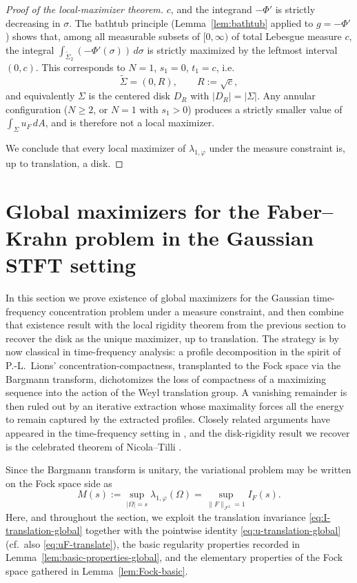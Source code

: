 \documentclass[a4paper,11pt,reqno]{amsart}
\numberwithin{equation}{section}
\theoremstyle{plain} %
\theoremstyle{definition} %
\theoremstyle{remark}
\begin{document}
\begin{proof}[Proof of the local-maximizer theorem]
\(c\), and the integrand \(-\Phi'\) is strictly decreasing in \(\sigma\). The
bathtub principle (Lemma~\ref{lem:bathtub} applied to \(g=-\Phi'\)) shows
that, among all measurable subsets of \([0,\infty)\) of total Lebesgue measure
\(c\), the integral \(\int_{\widetilde\Sigma_2}(-\Phi'(\sigma))\,d\sigma\) is
strictly maximized by the leftmost interval \((0,c)\). This corresponds to
\(N=1\), \(s_1=0\), \(t_1=c\), i.e.
\[
\widetilde \Sigma=(0,R),
\qquad R:=\sqrt c,
\]
and equivalently \(\Sigma\) is the centered disk \(D_R\) with
\(|D_R|=|\Sigma|\). Any annular configuration (\(N\ge 2\), or \(N=1\) with
\(s_1>0\)) produces a strictly smaller value of \(\int_\Sigma u_F\,dA\), and is
therefore not a local maximizer.

We conclude that every local maximizer of \(\lambda_{1,\varphi}\) under the
measure constraint is, up to translation, a disk.
\end{proof}



\section{Global maximizers for the Faber--Krahn problem in the Gaussian STFT setting}\label{sec:global-max}

In this section we prove existence of global maximizers for the Gaussian
time-frequency concentration problem under a measure constraint, and then
combine that existence result with the local rigidity theorem from the previous
section to recover the disk as the unique maximizer, up to translation. The
strategy is by now classical in time-frequency analysis: a profile decomposition
in the spirit of P.-L.~Lions' concentration-compactness, transplanted to the
Fock space via the Bargmann transform, dichotomizes the loss of compactness of a
maximizing sequence into the action of the Weyl translation group. A vanishing
remainder is then ruled out by an iterative extraction whose maximality forces
all the energy to remain captured by the extracted profiles. Closely related
arguments have appeared in the time-frequency setting in
\cite{Nicola-Romero-Trapasso, Marceca-Romero-Speckbacher, Fulsche-Hagger,
Samuelsen}, and the disk-rigidity result we recover is the celebrated theorem
of Nicola--Tilli \cite{Nicola-Tilli, Nicola-Tilli-2}.

Since the Bargmann transform is unitary, the variational problem may be written
on the Fock space side as
\[
M(s):=\sup_{|\Omega|=s}\lambda_{1,\varphi}(\Omega)
=
\sup_{\|F\|_{\mathcal F^2}=1} I_F(s).
\]
Here, and throughout the section, we exploit the translation invariance
\eqref{eq:I-translation-global} together with the pointwise identity
\eqref{eq:u-translation-global} (cf.\ also \eqref{eq:uF-translate}), the
basic regularity properties recorded in Lemma~\ref{lem:basic-properties-global},
and the elementary properties of the Fock space gathered in
Lemma~\ref{lem:Fock-basic}.
\end{document}

